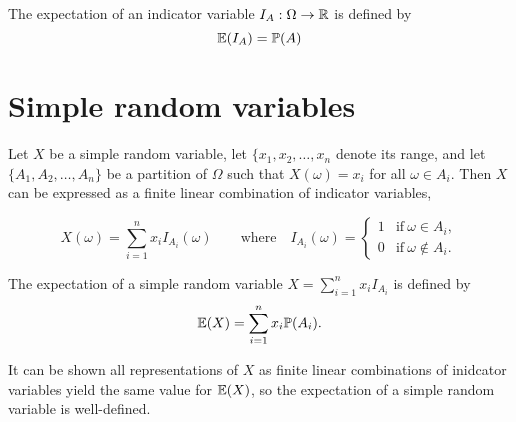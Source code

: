 \begin{definition}
The expectation of an indicator variable $I_A:\Omega\to\mathbb{R}$ is defined by
\[
\mathbb{E}(I_A) = \mathbb{P}(A)
\]
\end{definition}

\section{Simple random variables}\label{sec:expe_simple}


Let $X$ be a simple random variable, let $\{x_1,x_2,\ldots,x_n$ denote its range, and let $\{A_1,A_2,\ldots,A_n\}$ be a partition of $\Omega$ such that $X(\omega)=x_i$ for all $\omega\in A_i$. Then $X$ can be expressed as a finite linear combination of indicator variables,

\[
X(\omega) = \sum_{i=1}^n x_i I_{A_i}(\omega)\qquad\text{where}\quad I_{A_i}(\omega) = \begin{cases} 
	1 & \text{if}\ \omega\in A_i, \\
	0 & \text{if}\ \omega\notin A_i.
\end{cases}	
\]

\begin{definition}
The expectation of a simple random variable $\displaystyle X = \sum_{i=1}^n x_i I_{A_i}$ is defined by
\[
\mathbb{E}(X) = \sum_{i=1}^n x_i \mathbb{P}(A_i).
\]
\end{definition}

\begin{remark}
It can be shown all representations of $X$ as finite linear combinations of inidcator variables yield the same value for $\mathbb{E}(X)$, so the expectation of a simple random variable is well-defined.
\end{remark}


